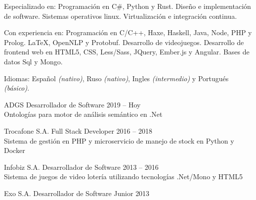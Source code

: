 \documentclass[10pt,a4paper]{article}
\begin{document}
\spacedhrule{0.8em}{-0.4em} %






\inlineheadsection
  { Especializado en: }
  { Programación en C\#, Python y Rust. Diseño e implementación de software. Sistemas operativos linux. Virtualización e integración continua. }

\inlineheadsection
  { Con experiencia en: }
  { Programación en C/C++, Haxe, Haskell, Java, Node, PHP y Prolog. \LaTeX, OpenNLP y Protobuf. Desarrollo de videojuegos. Desarrollo de frontend web en HTML5, CSS, Less/Sass, JQuery, Ember.js y Angular. Bases de datos Sql y Mongo. }

  \vspace{0.5em}
\inlineheadsection
  { Idiomas: }
  { Español \emph{(nativo)}, Ruso \emph{(nativo)}, Ingles \emph{(intermedio)} y Portugués \emph{(básico)}. }


\spacedhrule{1.9em}{-0.4em} %






\vspace{0.2em}
\headedsection
    { ADGS }
    { \textsc{} }{
    \headedsubsection
        { Desarrollador de Software }
        { 2019 -- Hoy }
        { \\ Ontologías para motor de análisis semántico en .Net \href{http://www.tasmo.ai/}{\ExternalLink} }
}

\vspace{0.2em}
\headedsection
    { Trocafone S.A. }
    { \textsc{} }{
    \headedsubsection
        { Full Stack Developer }
        { 2016 -- 2018 }
        { \\ Sistema de gestión en PHP y microservicio de manejo de stock en Python y Docker }
}

\vspace{0.2em}
\headedsection
    { Infobiz S.A. }
    { \textsc{} }{
    \headedsubsection
        { Desarrollador de Software }
        { 2013 -- 2016 }
        { \\ Sistema de juegos de video lotería utilizando tecnologías .Net/Mono y HTML5 \href{http://www.infobiz.com.ar/english/ticket_games.php}{\ExternalLink} }
}

\vspace{0.2em}
\headedsection
    { Exo S.A. }
    { \textsc{} }{
    \headedsubsection
        { Desarrollador de Software Junior }
        { 2013 }
        {}
}
\end{document}
